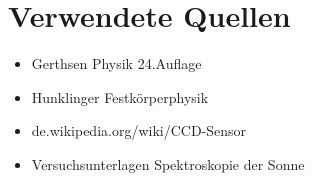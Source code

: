 \section{Verwendete Quellen} %
\label{sec:verwendete_quellen}

	\begin{itemize}
		\setlength\itemsep{1em}
		\item Gerthsen Physik 24.Auflage
		\item Hunklinger Festkörperphysik
		\item de.wikipedia.org/wiki/CCD-Sensor
		\item Versuchsunterlagen Spektroskopie der Sonne
	\end{itemize}

